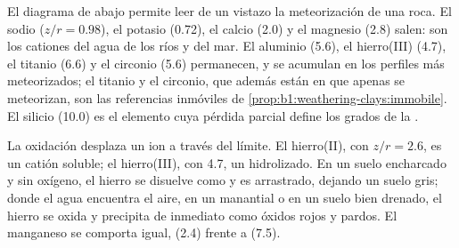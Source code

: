El diagrama de abajo permite leer de un vistazo la meteorización de una roca. El sodio ($z/r = 0.98$), el potasio (0.72), el calcio (2.0) y el
magnesio (2.8) salen: son los cationes del agua de los ríos y del mar. El aluminio (5.6), el hierro(III) (4.7), el titanio (6.6) y el circonio (5.6)
permanecen, y se acumulan en los perfiles más meteorizados; el titanio y el circonio, que además están en  que apenas se meteorizan, son las
referencias inmóviles de \cref{prop:b1:weathering-clays:immobile}. El silicio (10.0) es el elemento cuya pérdida parcial define los grados de la .

La oxidación desplaza un ion a través del límite. El hierro(II), con $z/r = 2.6$, es un catión soluble; el hierro(III), con 4.7, un hidrolizado. En un
suelo encharcado y sin oxígeno, el hierro se disuelve como  y es arrastrado, dejando un suelo gris; donde el agua encuentra el aire, en un
manantial o en un suelo bien drenado, el hierro se oxida y precipita de inmediato como óxidos rojos y pardos. El manganeso se comporta igual,
 (2.4) frente a  (7.5).

